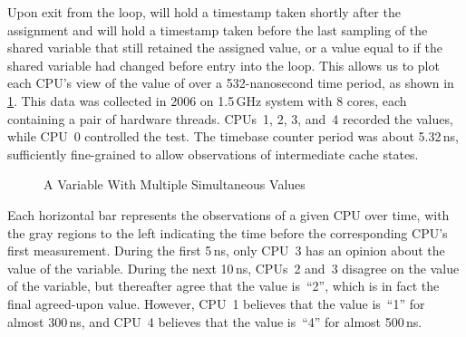 Upon exit from the loop,  will hold a timestamp
taken shortly after the assignment and  will hold
a timestamp taken before the last sampling of the shared variable
that still retained the assigned value, or a value equal to 
if the shared variable had changed before entry into the loop.
This allows us to plot each CPU's view of the value of 
over a 532-nanosecond time period, as shown in
\cref{fig:memorder:A Variable With Multiple Simultaneous Values}.
This data was collected in 2006 on 1.5\,GHz  system with 8 cores,
each containing a pair of hardware threads.
CPUs~1, 2, 3, and~4 recorded the values, while CPU~0 controlled the test.
The timebase counter period was about 5.32\,ns, sufficiently fine-grained
to allow observations of intermediate cache states.

\begin{figure}
\centering
{}
\caption{A Variable With Multiple Simultaneous Values}
\label{fig:memorder:A Variable With Multiple Simultaneous Values}
\end{figure}

Each horizontal bar represents the observations of a given CPU over time,
with the gray regions to the left indicating the time before the
corresponding CPU's first measurement.
During the first 5\,ns, only CPU~3 has an opinion about the value of the
variable.
During the next 10\,ns, CPUs~2 and~3 disagree on the value of the variable,
but thereafter agree that the value is~``2'', which is in fact
the final agreed-upon value.
However, CPU~1 believes that the value is~``1'' for almost 300\,ns, and
CPU~4 believes that the value is~``4'' for almost 500\,ns.

